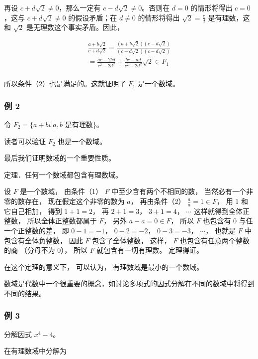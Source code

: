 再设 \(c + d\sqrt{2} \neq 0\)，那么一定有
\(c - d\sqrt{2} \neq 0\)。否则在 \(d = 0\) 的情形将得出 \(c = 0\)，这与
\(c + d\sqrt{2} \neq 0\) 的假设矛盾；在 \(d \neq 0\) 的情形将得出
\(\sqrt{2} = \frac{c}{d}\) 是有理数，这和 \(\sqrt{2}\)
是无理数这个事实矛盾。因此，

\[
\begin{array}{l} \frac {a + b \sqrt {2}}{c + d \sqrt {2}} = \frac {(a + b \sqrt {2}) (c - d \sqrt {2})}{(c + d \sqrt {2}) (c - d \sqrt {2})} \\ = \frac {a c - 2 b d}{c ^ {2} - 2 d ^ {2}} + \frac {b c - a d}{c ^ {2} - 2 d ^ {2}} \sqrt {2} \in F _ {1} \\ \end{array}
\]

所以条件（2）也是满足的。这就证明了 \(F_{1}\) 是一个数域。

\subsubsection{例 2}

令 \(F_{2} = \{a + bi|a, b\) 是有理数\}。

读者可以验证 \(F_{2}\) 也是一个数域。

最后我们证明数域的一个重要性质。

定理．任何一个数域都包含有理数域。

 设 \(F\) 是一个数域， 由条件（1） \(F\)
中至少含有两个不相同的数， 当然必有一个非零的数存在，
现在假定这个非零的数为 \(a\)， 再由条件（2） \(\frac{a}{a} = 1 \in F\)，
用 1 和它自己相加， 得到 \(1 + 1 = 2\)， 再 \(2 + 1 = 3\)，
\(3 + 1 = 4\)， \(\cdots\) 这样就得到全体正整数， 所以全体正整数都属于
\(F\)， 另外 \(a - a = 0 \in F\)， 所以 \(F\) 也包含有 0
与任一个正整数的差， 即 \(0 - 1 = -1\)， \(0 - 2 = -2\)，
\(0 - 3 = -3\)， \(\cdots\)， 也就是 \(F\) 中包含有全体负整数， 因此
\(F\) 包含了全体整数， 这样， \(F\) 也包含有任意两个整数的商 （分母不为
0）， 所以 \(F\) 就包含有一切有理数。 定理得证。

在这个定理的意义下， 可以认为， 有理数域是最小的一个数域。

数域是代数中一个很重要的概念，如讨论多项式的因式分解在不同的数域中将得到不同的结果。

\subsubsection{例 3}

分解因式 \(x^{4} - 4\)。

 在有理数域中分解为

